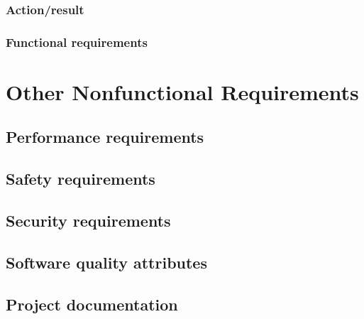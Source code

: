 \documentclass[10pt]{article}
\begin{document}
\lipsum[10]

\subsubsection{Action/result}

\lipsum[10]

\subsubsection{ Functional requirements}

\lipsum[10]








\section{Other Nonfunctional Requirements}

\subsection{Performance requirements}

\lipsum[10]

\subsection{Safety requirements}

\lipsum[10]

\subsection{Security requirements}

\lipsum[10]

\subsection{Software quality attributes}

\lipsum[10]

\subsection{Project documentation}
\end{document}
